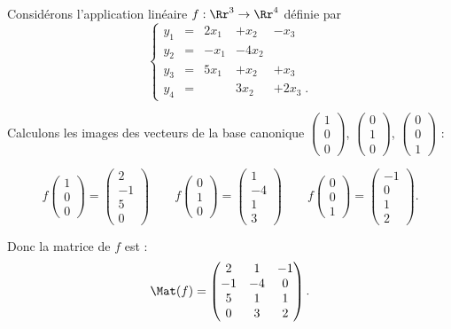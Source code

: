 \documentclass[class=report,crop=false]{standalone}
\begin{document}
\begin{exemple}
Considérons l'application linéaire $f : \Rr^3 \to \Rr^4$ définie par
$$ \left\{\begin{array}{ccccccc}
y_1 & = & 2x_1  &+ x_2   & -  x_3\\
y_2 & = & -x_1 &-  4x_2 &         \\
y_3 & = & 5x_1  &+  x_2  & +  x_3 \\
y_4 & = &       & 3x_2  & +  2x_3\;.
\end{array}\right.
$$

Calculons les images des vecteurs de la base canonique
  $\left(\begin{smallmatrix} 1 \\ 0 \\ 0 \end{smallmatrix} \right)$,
  $\left(\begin{smallmatrix} 0 \\ 1 \\ 0 \end{smallmatrix} \right)$,
  $\left(\begin{smallmatrix} 0 \\ 0 \\ 1 \end{smallmatrix} \right)$ :

$$f\begin{pmatrix} 1 \\ 0 \\ 0 \end{pmatrix} = \begin{pmatrix} 2 \\ -1 \\ 5 \\ 0 \end{pmatrix}\qquad
  f\begin{pmatrix} 0 \\ 1 \\ 0 \end{pmatrix} = \begin{pmatrix} 1 \\ -4 \\ 1 \\ 3 \end{pmatrix}\qquad
  f\begin{pmatrix} 0 \\ 0 \\ 1 \end{pmatrix} = \begin{pmatrix} -1 \\ 0 \\ 1 \\ 2 \end{pmatrix}.
  $$

Donc la matrice de $f$ est :
$$\Mat(f) =
\begin{pmatrix}
2 & 1 & -1 \\
-1& -4& 0  \\
 5& 1 & 1 \\
 0 & 3 & 2 \\
\end{pmatrix}.$$
\end{exemple}
\end{document}
